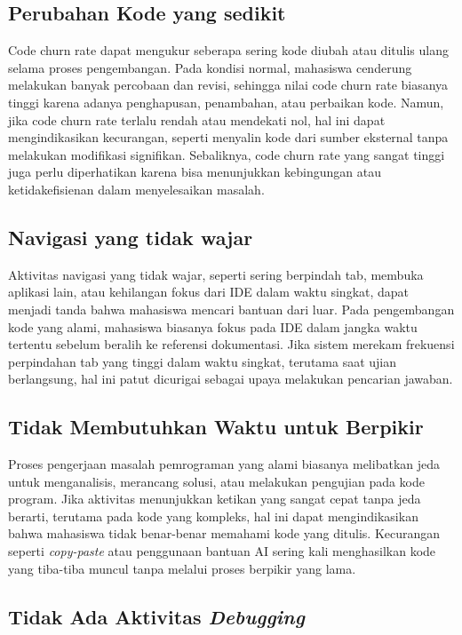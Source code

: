 \subsection{Perubahan Kode yang sedikit}

Code churn rate dapat mengukur seberapa sering kode diubah atau ditulis ulang selama proses pengembangan. Pada kondisi normal, mahasiswa cenderung melakukan banyak percobaan dan revisi, sehingga nilai code churn rate biasanya tinggi karena adanya penghapusan, penambahan, atau perbaikan kode. Namun, jika code churn rate terlalu rendah atau mendekati nol, hal ini dapat mengindikasikan kecurangan, seperti menyalin kode dari sumber eksternal tanpa melakukan modifikasi signifikan. Sebaliknya, code churn rate yang sangat tinggi juga perlu diperhatikan karena bisa menunjukkan kebingungan atau ketidakefisienan dalam menyelesaikan masalah.

\subsection{Navigasi yang tidak wajar}

Aktivitas navigasi yang tidak wajar, seperti sering berpindah tab, membuka aplikasi lain, atau kehilangan fokus dari IDE dalam waktu singkat, dapat menjadi tanda bahwa mahasiswa mencari bantuan dari luar. Pada pengembangan kode yang alami, mahasiswa biasanya fokus pada IDE dalam jangka waktu tertentu sebelum beralih ke referensi dokumentasi. Jika sistem merekam frekuensi perpindahan tab yang tinggi dalam waktu singkat, terutama saat ujian berlangsung, hal ini patut dicurigai sebagai upaya melakukan pencarian jawaban.

\subsection{Tidak Membutuhkan Waktu untuk Berpikir}

Proses pengerjaan masalah pemrograman yang alami biasanya melibatkan jeda untuk menganalisis, merancang solusi, atau melakukan pengujian pada kode program. Jika aktivitas menunjukkan ketikan yang sangat cepat tanpa jeda berarti, terutama pada kode yang kompleks, hal ini dapat mengindikasikan bahwa mahasiswa tidak benar-benar memahami kode yang ditulis. Kecurangan seperti \textit{copy-paste} atau penggunaan bantuan AI sering kali menghasilkan kode yang tiba-tiba muncul tanpa melalui proses berpikir yang lama.

\subsection{Tidak Ada Aktivitas \textit{Debugging}}

